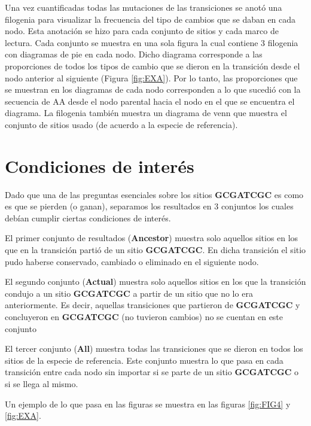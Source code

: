 \documentclass[
]{book}
\begin{document}
Una vez cuantificadas todas las mutaciones de las transiciones se anotó una filogenia para visualizar la frecuencia del tipo de cambios que se daban en cada nodo. Esta anotación se hizo para cada conjunto de sitios y cada marco de lectura. Cada conjunto se muestra en una sola figura la cual contiene 3 filogenia con diagramas de pie en cada nodo. Dicho diagrama corresponde a las proporciones de todos los tipos de cambio que se dieron en la transición desde el nodo anterior al siguiente (Figura \ref{fig:EXA}). Por lo tanto, las proporciones que se muestran en los diagramas de cada nodo corresponden a lo que sucedió con la secuencia de AA desde el nodo parental hacia el nodo en el que se encuentra el diagrama. La filogenia también muestra un diagrama de venn que muestra el conjunto de sitios usado (de acuerdo a la especie de referencia).

\hypertarget{condiciones-de-interuxe9s}{%
\section{Condiciones de interés}\label{condiciones-de-interuxe9s}}

Dado que una de las preguntas esenciales sobre los sitios \textbf{GCGATCGC} es como es que se pierden (o ganan), separamos los resultados en 3 conjuntos los cuales debían cumplir ciertas condiciones de interés.

El primer conjunto de resultados (\textbf{Ancestor}) muestra solo aquellos sitios en los que en la transición partió de un sitio \textbf{GCGATCGC}. En dicha transición el sitio pudo haberse conservado, cambiado o eliminado en el siguiente nodo.

El segundo conjunto (\textbf{Actual}) muestra solo aquellos sitios en los que la transición condujo a un sitio \textbf{GCGATCGC} a partir de un sitio que no lo era anteriormente. Es decir, aquellas transiciones que partieron de \textbf{GCGATCGC} y concluyeron en \textbf{GCGATCGC} (no tuvieron cambios) no se cuentan en este conjunto

El tercer conjunto (\textbf{All}) muestra todas las transiciones que se dieron en todos los sitios de la especie de referencia. Este conjunto muestra lo que pasa en cada transición entre cada nodo sin importar si se parte de un sitio \textbf{GCGATCGC} o si se llega al mismo.

Un ejemplo de lo que pasa en las figuras se muestra en las figuras \ref{fig:FIG4} y \ref{fig:EXA}.
\end{document}
